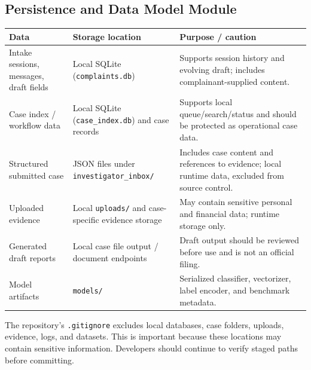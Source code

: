 \documentclass[12pt,a4paper,oneside]{report}
\begin{document}
\subsection{Persistence and Data Model Module}
\begin{longtable}{|>{\RaggedRight\arraybackslash}p{}|>{\RaggedRight\arraybackslash}p{}|>{\RaggedRight\arraybackslash}p{}|}
\hline
\textbf{Data} & \textbf{Storage location} & \textbf{Purpose / caution} \\\hline
Intake sessions, messages, draft fields & Local SQLite (\texttt{complaints.db}) & Supports session history and evolving draft; includes complainant-supplied content. \\\hline
Case index / workflow data & Local SQLite (\texttt{case\_index.db}) and case records & Supports local queue/search/status and should be protected as operational case data. \\\hline
Structured submitted case & JSON files under \texttt{investigator\_inbox/} & Includes case content and references to evidence; local runtime data, excluded from source control. \\\hline
Uploaded evidence & Local \texttt{uploads/} and case-specific evidence storage & May contain sensitive personal and financial data; runtime storage only. \\\hline
Generated draft reports & Local case file output / document endpoints & Draft output should be reviewed before use and is not an official filing. \\\hline
Model artifacts & \texttt{models/} & Serialized classifier, vectorizer, label encoder, and benchmark metadata. \\\hline
\end{longtable}
\vspace{2mm}
The repository's \texttt{.gitignore} excludes local databases, case folders, uploads, evidence, logs, and datasets. This is important because these locations may contain sensitive information. Developers should continue to verify staged paths before committing.\par\medskip
\end{document}
